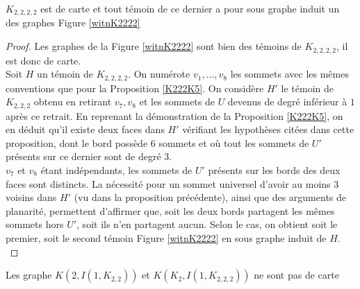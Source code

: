 \documentclass{scrartcl}
\begin{document}
\begin{flushleft}
\begin{lem*}[\ref{formeK2222}]
    $K_{2,2,2,2}$ est de carte et tout témoin de ce dernier a pour sous graphe induit un des graphes Figure \ref{witnK2222}
\end{lem*}

\begin{proof}
    Les graphes de la Figure \ref{witnK2222} sont bien des témoins de $K_{2,2,2,2}$, il est donc de carte.\\
    Soit $H$ un témoin de $K_{2,2,2,2}$. On numérote $v_1, ..., v_8$ les sommets avec les mêmes conventions que pour la Proposition
    \ref{K222K5}. On considère $H'$ le témoin de $K_{2,2,2}$ obtenu en retirant $v_7, v_8$ et les sommets de $U$ devenus
    de degré inférieur à $1$ après ce retrait. En reprenant la démonstration de la Proposition \ref{K222K5}, on en déduit
    qu'il existe deux faces dans $H'$ vérifiant les hypothèses citées dans cette proposition, dont le bord possède $6$
    sommets et où tout les sommets de $U'$ présents sur ce dernier sont de degré $3$.\\
    $v_7$ et $v_8$ étant indépendants, les sommets de $U'$ présents sur les bords des deux faces sont distincts. La nécessité
    pour un sommet universel d'avoir au moins $3$ voisins dans $H'$ (vu dans la proposition précédente), ainsi que des
    arguments de planarité, permettent d'affirmer que, soit les deux bords partagent les mêmes sommets hors $U'$, soit
    ils n'en partagent aucun. Selon le cas, on obtient soit le premier, soit le second témoin Figure \ref{witnK2222} en sous
    graphe induit de $H$.\\
\end{proof}

\begin{lem*}[\ref{2connstrictForbid}]
    Les graphe $K(2, I(1, K_{2,2}))$ et $K(K_2, I(1, K_{2,2,2}))$ ne sont pas de carte
\end{lem*}


\end{flushleft}
\end{document}
